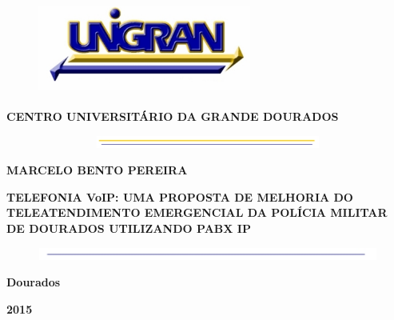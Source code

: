 \begin{center}   %

\begin{figure}[h] %
\centering        %
\includegraphics[width=7.0cm, height=3.0cm]{imagens/UNIGRAN.jpg} %
\end{figure}      %

\textbf{CENTRO UNIVERSITÁRIO DA GRANDE DOURADOS}

\begin{figure}[h]
\centering
\includegraphics[width=15.0cm, height=0.40cm]{imagens/AMARELO.jpg}
\end{figure}

\textbf{MARCELO BENTO PEREIRA} 
\\

\vspace{5cm}%

\textbf{TELEFONIA VoIP: UMA PROPOSTA DE MELHORIA DO TELEATENDIMENTO EMERGENCIAL DA POLÍCIA MILITAR DE DOURADOS UTILIZANDO PABX IP} %

\vspace{10cm}

\begin{figure}[h]
\centering
\includegraphics[width=15.0cm, height=0.40cm]{imagens/AZUL.jpg}

\end{figure}

\textbf{Dourados}
\vspace{-0,5cm} %

\textbf{2015}

\end{center}%

